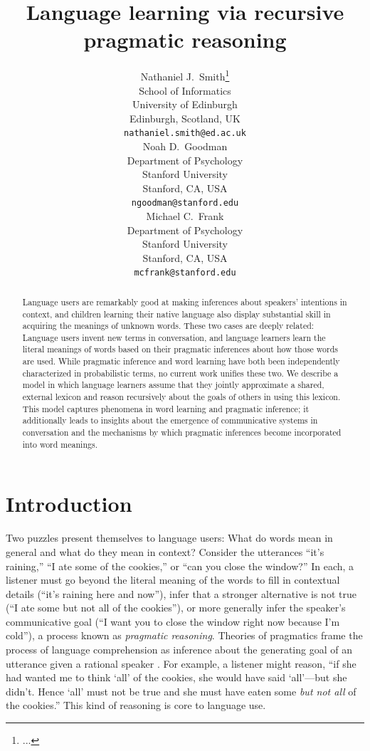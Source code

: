 \documentclass{article} %
\title{Language learning via recursive pragmatic reasoning}
\author{
Nathaniel J.~Smith\thanks{...} \\
School of Informatics\\
University of Edinburgh\\
Edinburgh, Scotland, UK\\
\texttt{nathaniel.smith@ed.ac.uk} \\
\AND
Noah D.~Goodman \\
Department of Psychology\\
Stanford University \\
Stanford, CA, USA \\
\texttt{ngoodman@stanford.edu} \\
\And
Michael C.~Frank \\
Department of Psychology \\
Stanford University \\
Stanford, CA, USA \\
\texttt{mcfrank@stanford.edu}}
\begin{document}
\maketitle

\begin{abstract}
  Language users are remarkably good at making inferences about
  speakers' intentions in context, and children learning their native
  language also display substantial skill in acquiring the
  meanings of unknown words. These two cases are deeply related:
  Language users invent new terms in conversation, and language
  learners learn the literal meanings of words based on their
  pragmatic inferences about how those words are used. 
 While pragmatic inference and word
  learning have both been independently characterized in probabilistic
  terms, no current work unifies these two. We describe a
  model in which language learners assume that they jointly
  approximate a shared, external lexicon and reason recursively about
  the goals of others in using this lexicon. This model captures
  phenomena in word learning and pragmatic inference; it additionally
  leads to insights about the emergence of communicative systems in
  conversation and the mechanisms by which pragmatic inferences become
  incorporated into word meanings.
\end{abstract}

\section{Introduction}

Two puzzles present themselves to language users: What do words mean in general and what do they mean in context?
Consider the utterances
``it's raining,'' ``I ate some of the cookies,'' or ``can you close
the window?'' In each, a listener must go beyond the literal meaning
of the words to fill in contextual details (``it's raining here and
now''), infer that a stronger alternative is not true (``I ate some
but not all of the cookies''), or more generally infer the speaker's
communicative goal (``I want you to close the window right now because
I'm cold''), a process known as \textit{pragmatic reasoning}. Theories of pragmatics frame
the process of language comprehension as inference about the
generating goal of an utterance given a rational speaker
\cite{grice1975,dale1995,frank2012}. For example, a listener might
reason, ``if she had wanted me to think `all' of the cookies, she
would have said `all'---but she didn't. Hence `all' must not be true
and she must have eaten some {\it but not all} of the cookies.'' This kind of reasoning is core to language use. 
\end{document}
